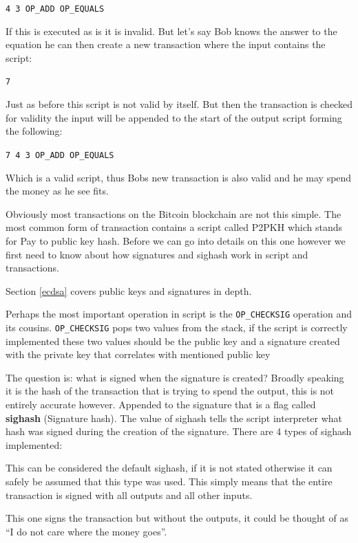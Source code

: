 \texttt{4 3 OP\_ADD OP\_EQUALS}

If this is executed as is it is invalid. But let's say Bob knows the answer to the equation he can then create a new transaction where the input contains the script: 

\texttt{7} 

Just as before this script is not valid by itself. But then the transaction is checked for validity the input will be appended to the start of the output script forming the following: 

\texttt{7 4 3 OP\_ADD OP\_EQUALS}

Which is a valid script, thus Bobs new transaction is also valid and he may spend the money as he see fits. 

Obviously most transactions on the Bitcoin blockchain are not this simple. The most common form of transaction contains a script called P2PKH which stands for Pay to public key hash. Before we can go into details on this one however we first need to know about how signatures and sighash work in script and transactions.

Section \ref{ecdsa} covers public keys and signatures in depth.

Perhaps the most important operation in script is the \texttt{OP\_CHECKSIG} operation and its cousins. \texttt{OP\_CHECKSIG} pops two values from the stack, if the script is correctly implemented these two values should be the public key and a signature created with the private key that correlates with mentioned public key

The question is: what is signed when the signature is created? Broadly speaking it is the hash of the transaction that is trying to spend the output, this is not entirely accurate however.\cite{antonopoulos_2017} Appended to the signature that is a flag called \textbf{sighash} (Signature hash). The value of sighash tells the script interpreter what hash was signed during the creation of the signature.\cite{bitcoin_core_sighash} There are 4 types of sighash implemented:

This can be considered the default sighash, if it is not stated otherwise it can safely be assumed that this type was used. This simply means that the entire transaction is signed with all outputs and all other inputs.

This one signs the transaction but without the outputs, it could be thought of as \enquote{I do not care where the money goes}.

